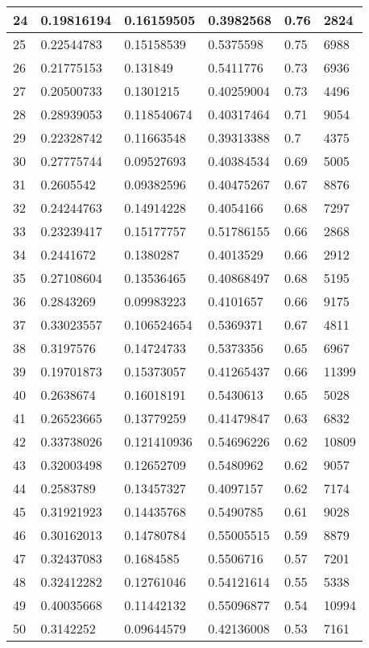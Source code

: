\begin{longtable}{|l|l|l|l|l|l|}
24 & 0.19816194 & 0.16159505 & 0.3982568 & 0.76 & 2824 \\ \hline 
25 & 0.22544783 & 0.15158539 & 0.5375598 & 0.75 & 6988 \\ \hline 
26 & 0.21775153 & 0.131849 & 0.5411776 & 0.73 & 6936 \\ \hline 
27 & 0.20500733 & 0.1301215 & 0.40259004 & 0.73 & 4496 \\ \hline 
28 & 0.28939053 & 0.118540674 & 0.40317464 & 0.71 & 9054 \\ \hline 
29 & 0.22328742 & 0.11663548 & 0.39313388 & 0.7 & 4375 \\ \hline 
30 & 0.27775744 & 0.09527693 & 0.40384534 & 0.69 & 5005 \\ \hline 
31 & 0.2605542 & 0.09382596 & 0.40475267 & 0.67 & 8876 \\ \hline 
32 & 0.24244763 & 0.14914228 & 0.4054166 & 0.68 & 7297 \\ \hline 
33 & 0.23239417 & 0.15177757 & 0.51786155 & 0.66 & 2868 \\ \hline 
34 & 0.2441672 & 0.1380287 & 0.4013529 & 0.66 & 2912 \\ \hline 
35 & 0.27108604 & 0.13536465 & 0.40868497 & 0.68 & 5195 \\ \hline 
36 & 0.2843269 & 0.09983223 & 0.4101657 & 0.66 & 9175 \\ \hline 
37 & 0.33023557 & 0.106524654 & 0.5369371 & 0.67 & 4811 \\ \hline 
38 & 0.3197576 & 0.14724733 & 0.5373356 & 0.65 & 6967 \\ \hline 
39 & 0.19701873 & 0.15373057 & 0.41265437 & 0.66 & 11399 \\ \hline 
40 & 0.2638674 & 0.16018191 & 0.5430613 & 0.65 & 5028 \\ \hline 
41 & 0.26523665 & 0.13779259 & 0.41479847 & 0.63 & 6832 \\ \hline 
42 & 0.33738026 & 0.121410936 & 0.54696226 & 0.62 & 10809 \\ \hline 
43 & 0.32003498 & 0.12652709 & 0.5480962 & 0.62 & 9057 \\ \hline 
44 & 0.2583789 & 0.13457327 & 0.4097157 & 0.62 & 7174 \\ \hline 
45 & 0.31921923 & 0.14435768 & 0.5490785 & 0.61 & 9028 \\ \hline 
46 & 0.30162013 & 0.14780784 & 0.55005515 & 0.59 & 8879 \\ \hline 
47 & 0.32437083 & 0.1684585 & 0.5506716 & 0.57 & 7201 \\ \hline 
48 & 0.32412282 & 0.12761046 & 0.54121614 & 0.55 & 5338 \\ \hline 
49 & 0.40035668 & 0.11442132 & 0.55096877 & 0.54 & 10994 \\ \hline 
50 & 0.3142252 & 0.09644579 & 0.42136008 & 0.53 & 7161 \\ \hline 
\end{longtable}